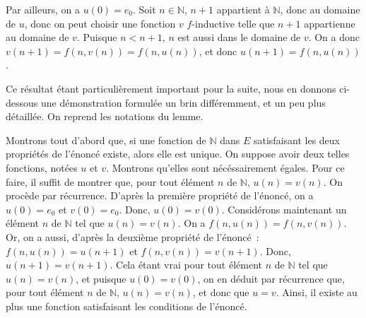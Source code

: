    Par ailleurs, on a $u(0) = e_0$. 
   Soit $n \in \mathbb{N}$, $n+1$ appartient à $\mathbb{N}$, donc au domaine de $u$, donc on peut choisir une fonction $v$ $f$-inductive telle que $n+1$ appartienne au domaine de $v$. 
   Puisque $n < n+1$, $n$ est aussi dans le domaine de $v$. 
   On a donc $v(n+1) = f(n, v(n)) = f(n,u(n))$, et donc $u(n+1) = f(n, u(n))$.

  \done 

\medskip 

Ce résultat étant particulièrement important pour la suite, nous en donnons ci-dessous une démonstration formulée un brin différemment, et un peu plus détaillée. 
On reprend les notations du lemme. 

Montrons tout d'abord que, si une fonction de $\mathbb{N}$ dans $E$ satisfaisant les deux propriétés de l'énoncé existe, alors elle est unique. 
On suppose avoir deux telles fonctions, notées $u$ et $v$. 
Montrons qu'elles sont nécéssairement égales. 
Pour ce faire, il suffit de montrer que, pour tout élément $n$ de $\mathbb{N}$, $u(n) = v(n)$. 
On procède par récurrence. 
D'après la première propriété de l'énoncé, on a $u(0) = e_0$ et $v(0) = e_0$. 
Donc, $u(0) = v(0)$. 
Considérons maintenant un élément $n$ de $\mathbb{N}$ tel que $u(n) = v(n)$. 
On a $f(n, u(n)) = f(n, v(n))$. 
Or, on a aussi, d'après la deuxième propriété de l'énoncé : $f(n, u(n)) = u(n+1)$ et $f(n, v(n)) = v(n+1)$. 
Donc, $u(n+1) = v(n+1)$. 
Cela étant vrai pour tout élément $n$ de $\mathbb{N}$ tel que $u(n) = v(n)$, et puisque $u(0) = v(0)$, on en déduit par récurrence que, pour tout élément $n$ de $\mathbb{N}$, $u(n) = v(n)$, et donc que $u = v$. 
Ainsi, il existe au plus une fonction satisfaisant les conditions de l'énoncé.

